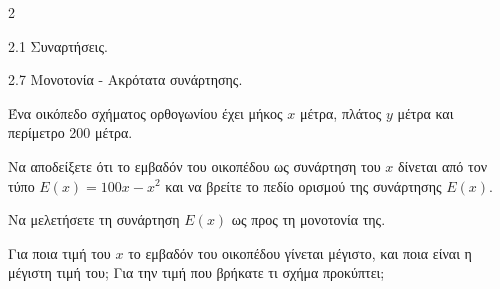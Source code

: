 \begin{ylh}{2}
    \item 2.1 Συναρτήσεις.
    \item 2.7 Μονοτονία - Ακρότατα συνάρτησης.
\end{ylh}
Ένα οικόπεδο σχήματος ορθογωνίου έχει μήκος $x$ μέτρα, πλάτος $y$ μέτρα και περίμετρο 200 μέτρα.
\begin{alist}
    \item Να αποδείξετε ότι το εμβαδόν του οικοπέδου ως συνάρτηση του $x$ δίνεται από τον τύπο
    $E(x) = 100x - x^2$ και να βρείτε το πεδίο ορισμού της συνάρτησης $E(x)$.
    
    \item Να μελετήσετε τη συνάρτηση $E(x)$ ως προς τη μονοτονία της.
    
    \item Για ποια τιμή του $x$ το εμβαδόν του οικοπέδου γίνεται μέγιστο, και ποια είναι η μέγιστη τιμή του; Για την τιμή που βρήκατε τι σχήμα προκύπτει;
\end{alist}

